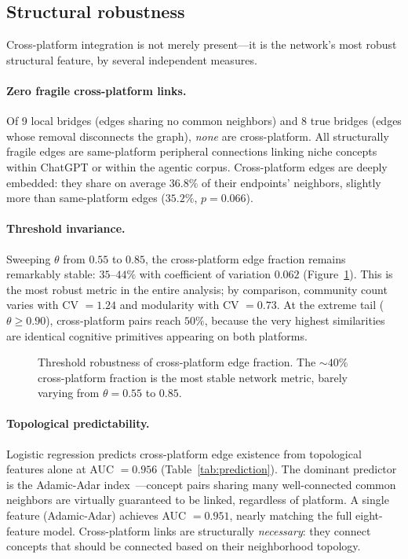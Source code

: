 \documentclass[11pt,twocolumn]{article}
\begin{document}
\subsection{Structural robustness}
\label{sec:results:robust}

Cross-platform integration is not merely present---it is the network's most robust structural feature, by several independent measures.

\paragraph{Zero fragile cross-platform links.}
Of 9 local bridges (edges sharing no common neighbors) and 8 true bridges (edges whose removal disconnects the graph), \emph{none} are cross-platform.
All structurally fragile edges are same-platform peripheral connections linking niche concepts within ChatGPT or within the agentic corpus.
Cross-platform edges are deeply embedded: they share on average $36.8\%$ of their endpoints' neighbors, slightly more than same-platform edges ($35.2\%$, $p = 0.066$).

\paragraph{Threshold invariance.}
Sweeping $\theta$ from $0.55$ to $0.85$, the cross-platform edge fraction remains remarkably stable: $35$--$44\%$ with coefficient of variation $0.062$ (Figure~\ref{fig:robustness}).
This is the most robust metric in the entire analysis; by comparison, community count varies with CV $= 1.24$ and modularity with CV $= 0.73$.
At the extreme tail ($\theta \geq 0.90$), cross-platform pairs reach $50\%$, because the very highest similarities are identical cognitive primitives appearing on both platforms.

\begin{figure}[t]
  \centering
  \caption{Threshold robustness of cross-platform edge fraction.  The $\sim$$40\%$ cross-platform fraction is the most stable network metric, barely varying from $\theta = 0.55$ to $0.85$.}
  \label{fig:robustness}
\end{figure}

\paragraph{Topological predictability.}
Logistic regression predicts cross-platform edge existence from topological features alone at AUC $= 0.956$ (Table~\ref{tab:prediction}).
The dominant predictor is the Adamic-Adar index~\citep{adamic2003friends}---concept pairs sharing many well-connected common neighbors are virtually guaranteed to be linked, regardless of platform.
A single feature (Adamic-Adar) achieves AUC $= 0.951$, nearly matching the full eight-feature model.
Cross-platform links are structurally \emph{necessary}: they connect concepts that should be connected based on their neighborhood topology.
\end{document}
